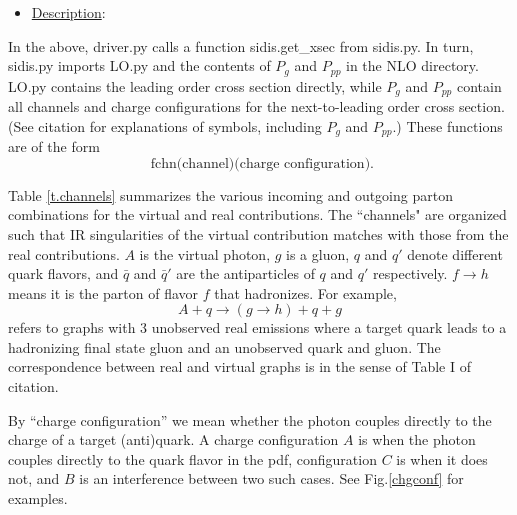 \documentclass[12pt]{article}
\newcommand\3[1]{\boldsymbol{#1}}
\begin{document}
\begin{itemize}
\item \underline{Description}:
\end{itemize}

In the above, driver.py calls a function sidis.get\_xsec from
sidis.py. In turn, sidis.py imports LO.py and the contents of $P_g$
and $P_{pp}$ in the NLO directory.  LO.py contains the leading order
cross section directly, while $P_g$ and $P_{pp}$ contain all channels
and charge configurations for the next-to-leading order cross section.
(See {\color{red} citation} for explanations of symbols, including
$P_g$ and $P_{pp}$.) These functions are of the form 
 $$
 {\text{ fchn(channel)(charge configuration)}} .
 $$



Table \ref{t.channels}  summarizes the various incoming and outgoing
parton combinations for the virtual and real contributions.  The
``channels" are organized  such that IR singularities of the virtual
contribution matches with those from the real contributions. $A$ is
the virtual photon, $g$ is a gluon, $q$ and $q'$ denote different
quark flavors, and $\bar{q}$ and $\bar{q}'$ are the antiparticles of
$q$ and $q'$ respectively.  $f \to h$ means it is the parton of flavor
$f$ that hadronizes.  For example,
$$
A+q \to(g \to h)+q+g
$$
refers to graphs with 3 unobserved real
emissions where a target quark leads to a hadronizing final state
gluon and an unobserved quark and gluon. The correspondence between
real and virtual graphs is in the sense of Table I of {\color{red}
citation}.

By ``charge configuration'' we mean whether the photon couples
directly to the charge of a target (anti)quark. A charge configuration
$A$ is when the photon couples directly to the quark flavor in the
pdf, configuration $C$ is when it does not, and $B$ is an interference
between two such cases. See Fig.\ref{chgconf} for examples.
\end{document}
